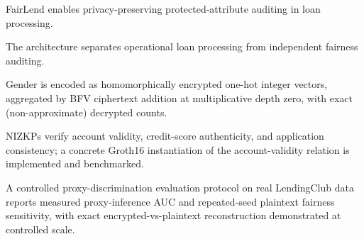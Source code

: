\documentclass[a4paper,fleqn]{cas-dc}
\begin{document}
\begin{abstract}
We present a controlled evaluation design based on the public LendingClub dataset, which does not contain observed gender labels. A synthetic binary protected attribute correlated with selected non-sensitive proxy variables is used to define a reproducible proxy-discrimination setting, and we report measured proxy-inference AUC and plaintext demographic-parity/equalised-odds sensitivity across repeated synthetic-label seeds and proxy-correlation strengths on the real LendingClub population. Exact encrypted-vs-plaintext count reconstruction and fairness-metric equivalence are demonstrated for the active BFV protocol at fixture scale and on the full 177{,}489-record real-data TEST partition across the complete five-$\alpha_1$ $\times$ ten-seed grid (50 configurations, logistic regression): all 600 aggregate-count comparisons matched exactly, with zero demographic-parity and equalised-odds reconstruction error. Random forest is evaluated in the plaintext sensitivity analysis but not under BFV encryption. A concrete Groth16 instantiation of one NIZKP relation (account-credential validity) is implemented and benchmarked, using circuit-compatible substitutes for the manuscript's generic signature and commitment primitives; the remaining two relations are formalised at the protocol level only. FairLend should therefore be understood as a privacy-preserving fairness-auditing architecture and proof-of-concept protocol design rather than a complete bias-mitigation mechanism, a fully end-to-end encrypted credit-scoring system, or a completed production benchmark.

\end{abstract}


\begin{highlights}
    \item FairLend enables privacy-preserving protected-attribute auditing in loan processing.
    \item The architecture separates operational loan processing from independent fairness auditing.
    \item Gender is encoded as homomorphically encrypted one-hot integer vectors, aggregated by BFV ciphertext addition at multiplicative depth zero, with exact (non-approximate) decrypted counts.
    \item NIZKPs verify account validity, credit-score authenticity, and application consistency; a concrete Groth16 instantiation of the account-validity relation is implemented and benchmarked.
    \item A controlled proxy-discrimination evaluation protocol on real LendingClub data reports measured proxy-inference AUC and repeated-seed plaintext fairness sensitivity, with exact encrypted-vs-plaintext reconstruction demonstrated at controlled scale.
\end{highlights}
\end{document}
